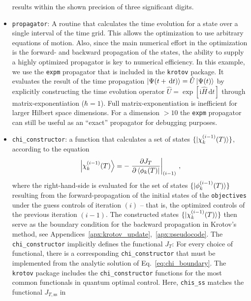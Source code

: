 \documentclass[submission, Phys]{SciPost}
\newcommand{\Op}[1]{\hat{#1}}
\newcommand{\dd}[0]{\,\text{d}}
\begin{document}
\begin{itemize}
      results within the shown precision of three significant digits.
    \item \texttt{propagator}: A routine that calculates the time evolution for
      a state over a single interval of the time grid. This allows the
      optimization to use arbitrary equations of motion. Also,
      since the main numerical effort in the optimization is the forward- and
      backward propagation of the states, the ability to supply a highly
      optimized propagator is key to numerical efficiency. In this example, we
      use the \texttt{expm} propagator that is included in the \texttt{krotov}
      package. It evaluates the result of the time propagation $\ket{\Psi(t+\dd
      t)} = \Op{U} \ket{\Psi(t)}$ by explicitly constructing the time evolution
      operator $\Op{U} = \exp[\mathrm{i} \Op{H} \dd t]$ through
      matrix-exponentiation ($\hbar = 1$). Full matrix-exponentiation is
      inefficient for larger Hilbert space dimensions. For a dimension $>10$ the
      \texttt{expm} propagator can still be useful as an ``exact'' propagator
      for debugging purposes.
    \item \texttt{chi\_constructor}: a function that calculates a set of states
      $\{\ket{\chi_k^{(i-1)}(T)}\}$, according to the equation
      \begin{equation}%
        \label{eq:chi_boundary}
        \Ket{\chi_k^{(i-1)}(T)}
        = - \left.\frac{\partial J_T}{\partial \Bra{\phi_k(T)}}
          \right\vert_{(i-1)}\,,
      \end{equation}
      where the right-hand-side is evaluated for the set of states
      $\{\ket{\phi_k^{(i-1)}(T)}\}$ resulting from the forward-propagation of
      the initial states of the \texttt{objectives} under the guess controls of
      iteration $(i)$ -- that is, the optimized controls of the previous
      iteration $(i-1)$.
      The constructed states $\{\ket{\chi_{k}^{(i-1)}(T)}\}$ then serve as the
      boundary condition for the backward propagation in Krotov's method, see
      Appendices~\ref{apx:krotov_update},~\ref{apx:pseudocode}.
      The \texttt{chi\_constructor} implicitly defines the functional $J_T$: For
      every choice of functional, there is a corresponding
      \texttt{chi\_constructor} that must be implemented from the analytic
      solution of Eq.~\eqref{eq:chi_boundary}.
      The \texttt{krotov} package includes the
      \texttt{chi\_constructor} functions for the most common functionals in
      quantum optimal control.
      Here, \texttt{chis\_ss} matches the functional $J_{T,\text{ss}}$ in

\end{itemize}
\end{document}
